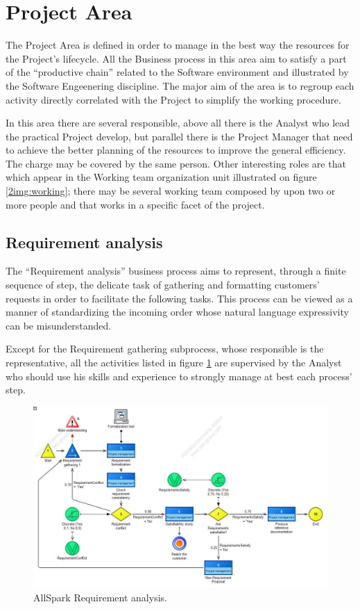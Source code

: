 \section{Project Area}
The Project Area is defined in order to manage in the best way the resources for the Project's lifecycle. All the Business process in this area aim to satisfy a part of the ``productive chain'' related to the Software environment and illustrated by the Software Engeenering discipline. The major aim of the area is to regroup each activity directly correlated with the Project to simplify the working procedure.

In this area there are several responsible, above all there is the Analyst who lead the practical Project develop, but parallel there is the Project Manager that need to achieve the better planning of the resources to improve the general efficiency. The charge may be covered by the same person. Other interesting roles are that which appear in the Working team organization unit illustrated on figure \ref{2img:working}; there may be several working team composed by upon two or more people and that works in a specific facet of the project.


\subsection{Requirement analysis}
\label{subsec:requirement}
The ``Requirement analysis'' business process aims to represent, through a finite sequence of step, the delicate task of gathering and formatting customers' requests in order to facilitate the following tasks. This process can be viewed as a manner of standardizing the incoming order whose natural language expressivity can be misunderstanded.

Except for the Requirement gathering subprocess, whose responsible is the representative, all the activities listed in figure \ref{2img:requirement} are supervised by the Analyst who should use his skills and experience to strongly manage at best each process' step.

\begin{figure}[ht!]
\begin{centering}
\includegraphics[scale=0.50, angle=90]{assign2/adonis/imgs/requirement.jpg}
\caption{AllSpark Requirement analysis.}
\label{2img:requirement}
\end{centering}
\end{figure}


